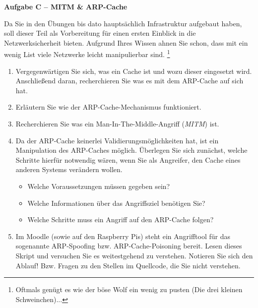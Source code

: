\documentclass[paper=a4,fontsize=11pt]{scrartcl}%
\numberwithin{equation}{section}
\begin{document}
\begin{center}\Large{\textbf{Aufgabe C -- MITM \& ARP-Cache}}\end{center}\vskip0.25in
Da Sie in den Übungen bis dato hauptsächlich Infrastruktur aufgebaut haben, soll dieser Teil als Vorbereitung für einen ersten Einblick in die Netzwerksicherheit bieten. Aufgrund Ihres Wissen ahnen Sie schon, dass mit ein wenig List viele Netzwerke leicht manipulierbar sind. \footnote{Oftmals genügt es wie der böse Wolf ein wenig zu pusten (Die drei kleinen Schweinchen)...}
\begin{enumerate}
	\item Vergegenwärtigen Sie sich, was ein Cache ist und wozu dieser eingesetzt wird. Anschließend daran, recherchieren Sie was es mit dem ARP-Cache auf sich hat.
	\item Erläutern Sie wie der ARP-Cache-Mechanismus funktioniert.
	\item Recherchieren Sie was ein Man-In-The-Middle-Angriff (\emph{MITM}) ist.
	\item Da der ARP-Cache keinerlei Validierungsmöglichkeiten hat, ist ein Manipulation des ARP-Caches möglich. Überlegen Sie sich zunächst, welche Schritte hierfür notwendig wären, wenn Sie als Angreifer, den Cache eines anderen Systems verändern wollen.
	\begin{itemize}
		\item Welche Voraussetzungen müssen gegeben sein?
		\item Welche Informationen über das Angriffsziel benötigen Sie?
		\item Welche Schritte muss ein Angriff auf den ARP-Cache folgen?
	\end{itemize}
	\item Im Moodle (sowie auf den Raspberry Pis) steht ein Angrifftool für das sogenannte ARP-Spoofing bzw. ARP-Cache-Poisoning bereit. Lesen dieses Skript und versuchen Sie es weitestgehend zu verstehen. Notieren Sie sich den Ablauf! Bzw. Fragen zu den Stellen im Quellcode, die Sie nicht verstehen.
\end{enumerate}
\end{document}
